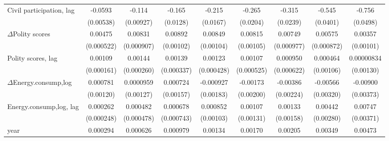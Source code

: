 \begin{table}[htbp]
\begin{tabular}{l*{8}{c}}
Civil participation, lag     &     -0.0593\sym{***}&      -0.114\sym{***}&      -0.165\sym{***}&      -0.215\sym{***}&      -0.265\sym{***}&      -0.315\sym{***}&      -0.545\sym{***}&      -0.756\sym{***}\\
                    &   (0.00538)         &   (0.00927)         &    (0.0128)         &    (0.0167)         &    (0.0204)         &    (0.0239)         &    (0.0401)         &    (0.0498)         \\
[1em]
$\Delta$Polity scores          &     0.00475\sym{***}&     0.00831\sym{***}&     0.00892\sym{***}&     0.00849\sym{***}&     0.00815\sym{***}&     0.00749\sym{***}&     0.00575\sym{***}&     0.00357\sym{***}\\
                    &  (0.000522)         &  (0.000907)         &   (0.00102)         &   (0.00104)         &   (0.00105)         &  (0.000977)         &  (0.000872)         &   (0.00101)         \\
[1em]
Polity scores, lag           &     0.00109\sym{***}&     0.00144\sym{***}&     0.00139\sym{***}&     0.00123\sym{***}&     0.00107\sym{**} &    0.000950         &    0.000464         &  0.00000834         \\
                    &  (0.000161)         &  (0.000260)         &  (0.000337)         &  (0.000428)         &  (0.000525)         &  (0.000622)         &   (0.00106)         &   (0.00130)         \\
[1em]
$\Delta$Energy.consump,log            &    0.000781         &   0.0000959         &    0.000724         &   -0.000927         &    -0.00173         &    -0.00386\sym{*}  &    -0.00566\sym{*}  &    -0.00900\sym{**} \\
                    &   (0.00120)         &   (0.00127)         &   (0.00157)         &   (0.00183)         &   (0.00200)         &   (0.00224)         &   (0.00320)         &   (0.00373)         \\
[1em]
Energy.consump,log, lag           &    0.000262         &    0.000482         &    0.000678         &    0.000852         &     0.00107         &     0.00133         &     0.00442         &     0.00747\sym{**} \\
                    &  (0.000248)         &  (0.000478)         &  (0.000743)         &   (0.00103)         &   (0.00131)         &   (0.00158)         &   (0.00280)         &   (0.00371)         \\
[1em]
year                &    0.000294\sym{***}&    0.000626\sym{***}&    0.000979\sym{***}&     0.00134\sym{***}&     0.00170\sym{***}&     0.00205\sym{***}&     0.00349\sym{***}&     0.00473\sym{***}\\

\end{tabular}
\end{table}
